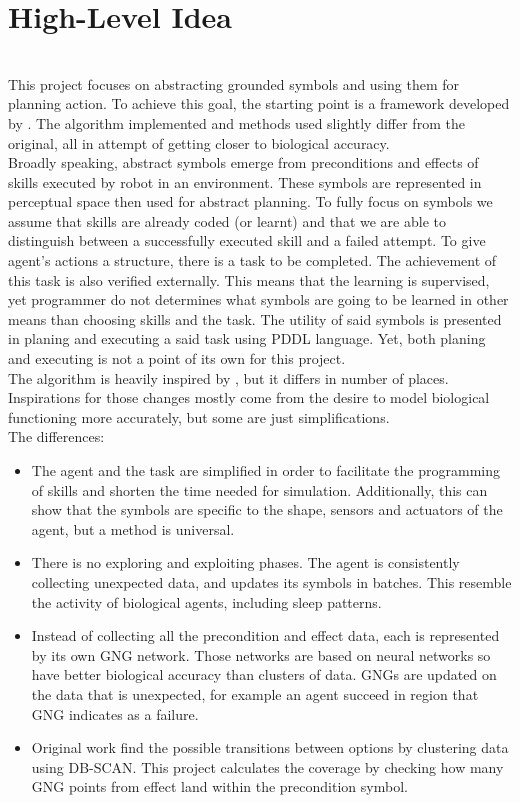 \section{High-Level Idea} \label{chapter:idea}
\\
This project focuses on abstracting grounded symbols and using them for planning action. To achieve this goal, the starting point is a framework developed by \textcite{konidaris2018skills}. The algorithm implemented and methods used slightly differ from the original, all in attempt of getting closer to biological accuracy.\\
Broadly speaking, abstract symbols emerge from preconditions and effects of skills executed by robot in an environment. These symbols are represented in perceptual space then used for abstract planning. To fully focus on symbols we assume that skills are already coded (or learnt) and that we are able to distinguish between a successfully executed skill and a failed attempt. To give agent's actions a structure, there is a task to be completed. The achievement of this task is also verified externally. This means that the learning is supervised, yet programmer do not determines what symbols are going to be learned in other means than choosing skills and the task. The utility of said symbols is presented in planing and executing a said task using PDDL language. Yet, both planing and executing is not a point of its own for this project.\\
The algorithm is heavily inspired by \textcite{konidaris2018skills}, but it differs in number of places. Inspirations for those changes mostly come from the desire to model biological functioning more accurately, but some are just simplifications.\\
The differences:
\begin{itemize}
    \item The agent and the task are simplified in order to facilitate the programming of skills and shorten the time needed for simulation. Additionally, this can show that the symbols are specific to the shape, sensors and actuators of the agent, but a method is universal.
    \item There is no exploring and exploiting phases. The agent is consistently collecting unexpected data, and updates its symbols in batches. This resemble the activity of biological agents, including sleep patterns. 
    \item Instead of collecting all the precondition and effect data, each is represented by its own GNG network. Those networks are based on neural networks so have better biological accuracy than clusters of data. GNGs are updated on the data that is unexpected, for example an agent succeed in region that GNG indicates as a failure.
    \item Original work find the possible transitions between options by clustering data using DB-SCAN. This project calculates the coverage by checking how many GNG points from effect land within the precondition symbol.
\end{itemize}

